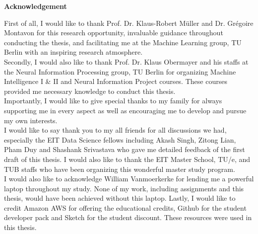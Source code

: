 \thispagestyle{empty}
\vspace*{3cm}
\begin{center}
    \textbf{Acknowledgement}
\end{center}

\noindent
First of all, I would like to thank Prof. Dr. Klaus-Robert M\"{u}ller and Dr. Gr\'{e}goire Montavon for this research opportunity, invaluable guidance throughout conducting the thesis, and facilitating me at the Machine Learning group, TU Berlin with an inspiring research atmosphere.
\\

\noindent
Secondly, I would also like to thank Prof. Dr. Klaus Obermayer and his staffs at the Neural Information Processing group, TU Berlin for organizing Machine Intelligence I \& II and Neural Information Project courses. These courses provided me necessary knowledge to conduct this thesis.
\\

\noindent
Importantly, I would like to give special thanks to my family for always supporting me in every aspect as well as encouraging me to develop and pursue my own interests.
\\

\noindent
I would like to say thank you to my all friends for all discussions we had, especially the EIT Data Science fellows including Akash Singh, Zitong Lian, Pham Duy and Shashank Srivastava who gave me detailed feedback of the first draft of this thesis. I would also like to thank the EIT Master School, TU/e, and TUB staffs who have been organizing this wonderful master study program.
\\

\noindent
I would also like to acknowledge William Vanmoerkerke for lending me a powerful laptop throughout my study. None of my work, including assignments and this thesis, would have been achieved without this laptop.  Lastly, I would like to credit Amazon AWS for offering the educational credits, Github for the student developer pack and Sketch for the student discount. These resources were used in this thesis.